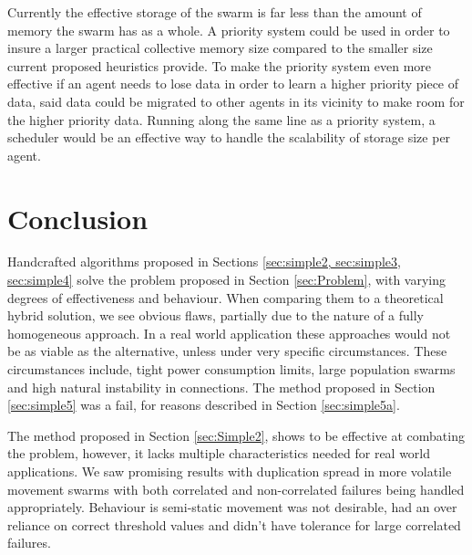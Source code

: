 \documentclass{UoYCSproject}
\begin{document}
Currently the effective storage of the swarm is far less than the amount of memory the swarm has as a whole. 
A priority system could be used in order to insure a larger practical collective memory size compared to the smaller size current proposed heuristics provide. 
To make the priority system even more effective if an agent needs to lose data in order to learn a higher priority piece of data, said data could be migrated to other agents in its vicinity to make room for the higher priority data. 
Running along the same line as a priority system, a scheduler would be an effective way to handle the scalability of storage size per agent.


\section{Conclusion}
\label{sec:conc}

Handcrafted algorithms proposed in Sections \ref{sec:simple2, sec:simple3, sec:simple4} solve the problem proposed in Section \ref{sec:Problem}, with varying degrees of effectiveness and behaviour. 
When comparing them to a theoretical hybrid solution, we see obvious flaws, partially due to the nature of a fully homogeneous approach. 
In a real world application these approaches would not be as viable as the alternative, unless under very specific circumstances. 
These circumstances include, tight power consumption limits, large population swarms and high natural instability in connections. 
The method proposed in Section \ref{sec:simple5} was a fail, for reasons described in Section \ref{sec:simple5a}.

The method proposed in Section \ref{sec:Simple2}, shows to be effective at combating the problem, however, it lacks multiple characteristics needed for real world applications. 
We saw promising results with duplication spread in more volatile movement swarms with both correlated and non-correlated failures being handled appropriately. 
Behaviour is semi-static movement was not desirable, had an over reliance on correct threshold values and didn’t have tolerance for large correlated failures.
\end{document}
